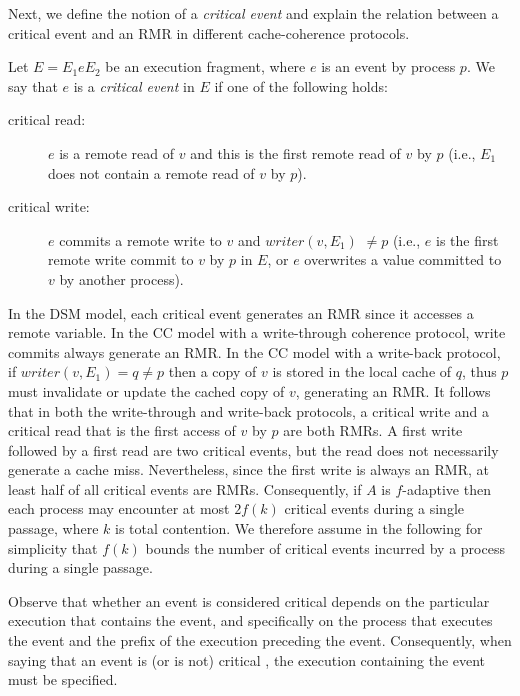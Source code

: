 Next, we define the notion of a \emph{critical event} and explain the relation between a critical event and an RMR in different cache-coherence protocols.

\begin{definition}
	Let $E=E_1 e E_2$ be an execution fragment, where $e$ is an event by process $p$. We say that $e$ is a \emph{critical event} in $E$ if one of the following holds:
	\begin{description}
		\item[critical read:] $e$ is a remote read of $v$ and this is the first remote read of $v$ by $p$ (i.e., $E_1$ does not contain a remote read of $v$ by $p$).
		\item[critical write:] $e$ commits a remote write to $v$ and $writer(v,E_1)$ $\neq p$ (i.e., $e$ is the first
remote write commit to $v$ by $p$ in $E$, or $e$ overwrites a value committed to $v$ by another process).
	\end{description}
\end{definition}

In the DSM model, each critical event generates an RMR since it accesses a remote variable.
In the CC model with a write-through coherence protocol, write commits always generate an RMR. In the CC model
with a write-back protocol, if $writer(v,E_1) = q \neq p$ then a copy of $v$ is stored in the local cache of $q$,
thus $p$ must invalidate or update the cached copy of $v$, generating an RMR. It follows that in both the write-through
and write-back protocols, a critical write and a critical read that is the first access of $v$ by $p$ are both RMRs.
A first write followed by a first read are two critical events, but the read does not necessarily generate a cache miss.
Nevertheless, since the first write is always an RMR, at least half of all critical events are RMRs.
Consequently, if $A$ is $f$-adaptive then each process may encounter at most $2f(k)$ critical events during a single passage,
where $k$ is total contention. We therefore assume in the following for simplicity that $f(k)$ bounds the
number of critical events incurred by a process during a single passage.

Observe that whether an event is considered critical depends on the particular execution that contains the event, and specifically on the process that executes the event and the prefix of the execution preceding the event. Consequently, when saying that an event is (or is not) critical , the execution containing the event must be specified.

